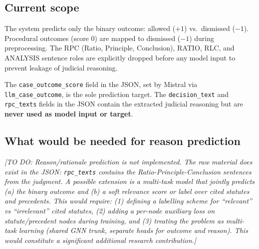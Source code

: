 \documentclass[12pt,a4paper]{article}
\newcommand{\todo}[1]{\textcolor{todo}{\textit{[TO DO: #1]}}}
\begin{document}
\subsection{Current scope}

The system predicts only the binary outcome: allowed ($+1$) vs.\ dismissed ($-1$). Procedural outcomes (score $0$) are mapped to dismissed ($-1$) during preprocessing. The RPC (Ratio, Principle, Conclusion), RATIO, RLC, and ANALYSIS sentence roles are explicitly dropped before any model input to prevent leakage of judicial reasoning.

The \texttt{case\_outcome\_score} field in the JSON, set by Mistral via \texttt{llm\_case\_outcome}, is the sole prediction target. The \texttt{decision\_text} and \texttt{rpc\_texts} fields in the JSON contain the extracted judicial reasoning but are \textbf{never used as model input or target}.

\subsection{What would be needed for reason prediction}

\todo{Reason/rationale prediction is not implemented. The raw material does exist in the JSON: \texttt{rpc\_texts} contains the Ratio-Principle-Conclusion sentences from the judgment. A possible extension is a multi-task model that jointly predicts (a) the binary outcome and (b) a soft relevance score or label over cited statutes and precedents. This would require: (1) defining a labelling scheme for ``relevant'' vs ``irrelevant'' cited statutes, (2) adding a per-node auxiliary loss on statute/precedent nodes during training, and (3) treating the problem as multi-task learning (shared GNN trunk, separate heads for outcome and reason). This would constitute a significant additional research contribution.}
\end{document}
